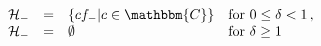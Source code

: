 \begin{equation}
\begin{array}{lcll}
\mathcal{H}_- & = & \left\{cf_-|c\in\mathbbm{C}\right\} & \text{for }
0 \leq \delta <1 \,,\\
\mathcal{H}_- & = & \emptyset & \text{for } \delta \geq 1\;
\end{array}
\end{equation}

